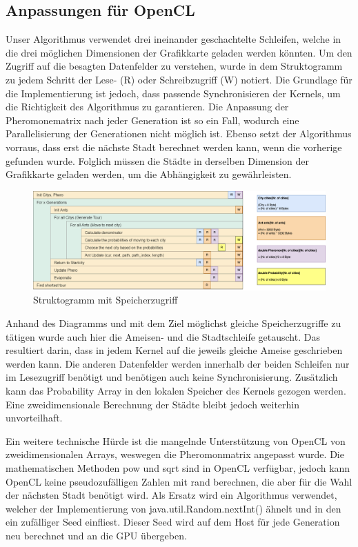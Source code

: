 \subsection*{Anpassungen für OpenCL}

Unser Algorithmus verwendet drei ineinander geschachtelte Schleifen, welche in die drei möglichen Dimensionen der Grafikkarte geladen werden könnten.
Um den Zugriff auf die besagten Datenfelder zu verstehen, wurde in dem Struktogramm zu jedem Schritt der Lese- (R) oder Schreibzugriff (W) notiert.
Die Grundlage für die Implementierung ist jedoch, dass passende Synchronisieren der Kernels, um die Richtigkeit des Algorithmus zu garantieren.
Die Anpassung der Pheromonematrix nach jeder Generation ist so ein Fall, wodurch eine Parallelisierung der Generationen nicht möglich ist.
Ebenso setzt der Algorithmus vorraus, dass erst die nächste Stadt berechnet werden kann, wenn die vorherige gefunden wurde.
Folglich müssen die Städte in derselben Dimension der Grafikkarte geladen werden, um die Abhängigkeit zu gewährleisten.

\begin{figure}[h]
    \centering
    \includegraphics[width=\textwidth]{../images/Speicherzugriff.png}
    \caption{Struktogramm mit Speicherzugriff}
    \label{fig:struktogramm-speicher}
\end{figure}

Anhand des Diagramms und mit dem Ziel möglichst gleiche Speicherzugriffe zu tätigen wurde auch hier die Ameisen- und die Stadtschleife getauscht.
Das resultiert darin, dass in jedem Kernel auf die jeweils gleiche Ameise geschrieben werden kann.
Die anderen Datenfelder werden innerhalb der beiden Schleifen nur im Lesezugriff benötigt und benötigen auch keine Synchronisierung.
Zusätzlich kann das Probability Array in den lokalen Speicher des Kernels gezogen werden.
Eine zweidimensionale Berechnung der Städte bleibt jedoch weiterhin unvorteilhaft.

Ein weitere technische Hürde ist die mangelnde Unterstützung von OpenCL von zweidimensionalen Arrays, weswegen die Pheromonmatrix angepasst wurde.
Die mathematischen Methoden pow und sqrt sind in OpenCL verfügbar, jedoch kann OpenCL keine pseudozufälligen Zahlen mit rand berechnen, die aber für die Wahl der nächsten Stadt benötigt wird.
Als Ersatz wird ein Algorithmus verwendet, welcher der Implementierung von java.util.Random.nextInt() ähnelt und in den ein zufälliger Seed einfliest.
Dieser Seed wird auf dem Host für jede Generation neu berechnet und an die GPU übergeben.

